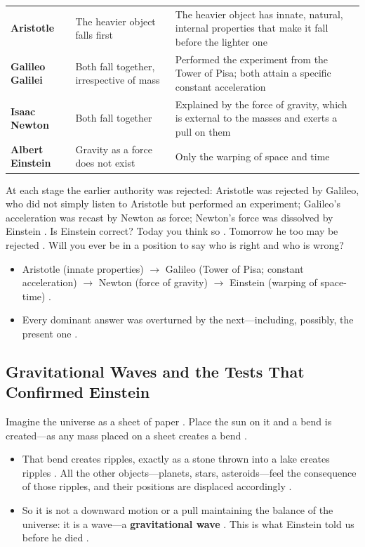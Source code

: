 \vspace{6pt}
\noindent
\begin{tabularx}{\textwidth}{p{3cm} p{4cm} Y}
\toprule
{}
 &  &  \\
\midrule
\textbf{Aristotle} & The heavier object falls first & The heavier object has innate, natural, internal properties that make it fall before the lighter one  \\
\textbf{Galileo Galilei} & Both fall together, irrespective of mass & Performed the experiment from the Tower of Pisa; both attain a specific constant acceleration  \\
\textbf{Isaac Newton} & Both fall together & Explained by the force of gravity, which is external to the masses and exerts a pull on them  \\
\textbf{Albert Einstein} & Gravity as a force does not exist & Only the warping of space and time  \\
\bottomrule
\end{tabularx}
\vspace{6pt}

At each stage the earlier authority was rejected: Aristotle was rejected by Galileo, who did not simply listen to Aristotle but performed an experiment; Galileo's acceleration was recast by Newton as force; Newton's force was dissolved by Einstein . Is Einstein correct? Today you think so . Tomorrow he too may be rejected . Will you ever be in a position to say who is right and who is wrong? 

\begin{QuickRevision}
\begin{itemize}
    \item Aristotle (innate properties) $\rightarrow$ Galileo (Tower of Pisa; constant acceleration) $\rightarrow$ Newton (force of gravity) $\rightarrow$ Einstein (warping of space-time) .
    \item Every dominant answer was overturned by the next---including, possibly, the present one .
\end{itemize}
\end{QuickRevision}

\subsection{Gravitational Waves and the Tests That Confirmed Einstein}
Imagine the universe as a sheet of paper . Place the sun on it and a bend is created---as any mass placed on a sheet creates a bend .
\begin{itemize}
    \item That bend creates ripples, exactly as a stone thrown into a lake creates ripples . All the other objects---planets, stars, asteroids---feel the consequence of those ripples, and their positions are displaced accordingly .
    \item So it is not a downward motion or a pull maintaining the balance of the universe: it is a wave---a \textbf{gravitational wave} . This is what Einstein told us before he died .
\end{itemize}

